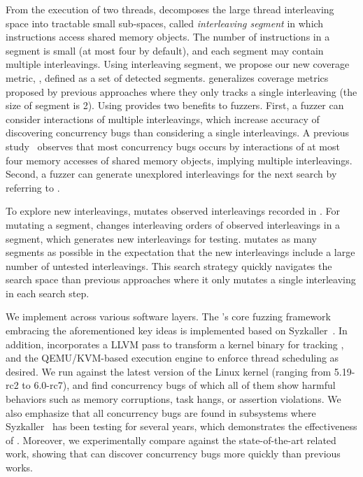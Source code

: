  From the execution of two threads,  
\sys decomposes the large thread interleaving space into tractable 
small sub-spaces, called \textit{interleaving segment} in which
instructions access shared memory objects. The number of instructions 
in a segment is small (at most four by default), and each segment may 
contain multiple interleavings. Using interleaving segment, we propose 
our new coverage metric, \textit{\intcov}, defined as a set of detected segments. \Intcov generalizes coverage 
metrics proposed by previous approaches where they only tracks 
a single interleaving (the size of segment is 2). 
Using \intcov provides two benefits to fuzzers. First, a fuzzer can 
consider interactions of multiple interleavings, which increase 
accuracy of discovering concurrency bugs than considering a single 
interleavings. A previous study~\cite{learningfrommistakes} observes that
most concurrency bugs occurs by interactions of at most four memory accesses of shared memory objects, implying multiple interleavings.
Second, a fuzzer can generate unexplored interleavings for the next 
search by referring to \intcov.

 To explore new interleavings,
\sys mutates observed interleavings recorded in \intcov. For mutating a segment, \sys changes interleaving orders of observed interleavings 
in a segment, which generates new interleavings for testing. \sys 
mutates as many segments as possible in the expectation that the 
new interleavings include a large number of untested interleavings. 
This search strategy quickly navigates the search space than previous 
approaches where it only mutates a single interleaving in each search step.



%
We implement \sys across various software layers.
The \sys's core fuzzing framework embracing the aforementioned key
ideas is implemented based on Syzkaller~\cite{syzkaller}.
%
In addition, \sys incorporates a LLVM pass to transform a kernel
binary for tracking \intcov, and the QEMU/KVM-based execution engine
to enforce thread scheduling as desired.
%
We run \sys against the latest version of the Linux kernel (ranging
from 5.19-rc2 to 6.0-rc7), and find \totalbugs concurrency bugs of
which all of them show harmful behaviors such as memory corruptions,
task hangs, or assertion violations. We also emphasize that all
concurrency bugs are found in subsystems where
Syzkaller~\cite{syzkaller} has been testing for several years, which
demonstrates the effectiveness of \sys.
%
Moreover, we experimentally compare \sys against the state-of-the-art
related work, showing that \sys can discover concurrency bugs more
quickly than previous works.





